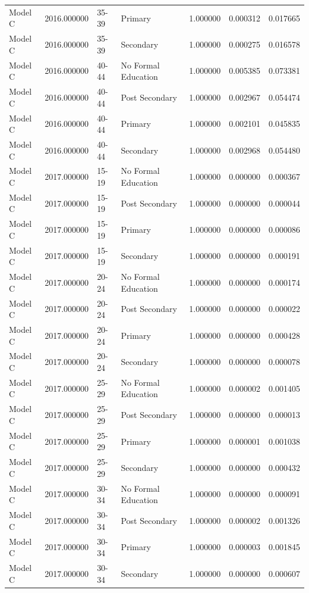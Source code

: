 \begin{table}[ht]
\begin{tabular}{lrllrrr}
Model C & 2016.000000 & 35-39 & Primary & 1.000000 & 0.000312 & 0.017665 \\
Model C & 2016.000000 & 35-39 & Secondary & 1.000000 & 0.000275 & 0.016578 \\
Model C & 2016.000000 & 40-44 & No Formal Education & 1.000000 & 0.005385 & 0.073381 \\
Model C & 2016.000000 & 40-44 & Post Secondary & 1.000000 & 0.002967 & 0.054474 \\
Model C & 2016.000000 & 40-44 & Primary & 1.000000 & 0.002101 & 0.045835 \\
Model C & 2016.000000 & 40-44 & Secondary & 1.000000 & 0.002968 & 0.054480 \\
Model C & 2017.000000 & 15-19 & No Formal Education & 1.000000 & 0.000000 & 0.000367 \\
Model C & 2017.000000 & 15-19 & Post Secondary & 1.000000 & 0.000000 & 0.000044 \\
Model C & 2017.000000 & 15-19 & Primary & 1.000000 & 0.000000 & 0.000086 \\
Model C & 2017.000000 & 15-19 & Secondary & 1.000000 & 0.000000 & 0.000191 \\
Model C & 2017.000000 & 20-24 & No Formal Education & 1.000000 & 0.000000 & 0.000174 \\
Model C & 2017.000000 & 20-24 & Post Secondary & 1.000000 & 0.000000 & 0.000022 \\
Model C & 2017.000000 & 20-24 & Primary & 1.000000 & 0.000000 & 0.000428 \\
Model C & 2017.000000 & 20-24 & Secondary & 1.000000 & 0.000000 & 0.000078 \\
Model C & 2017.000000 & 25-29 & No Formal Education & 1.000000 & 0.000002 & 0.001405 \\
Model C & 2017.000000 & 25-29 & Post Secondary & 1.000000 & 0.000000 & 0.000013 \\
Model C & 2017.000000 & 25-29 & Primary & 1.000000 & 0.000001 & 0.001038 \\
Model C & 2017.000000 & 25-29 & Secondary & 1.000000 & 0.000000 & 0.000432 \\
Model C & 2017.000000 & 30-34 & No Formal Education & 1.000000 & 0.000000 & 0.000091 \\
Model C & 2017.000000 & 30-34 & Post Secondary & 1.000000 & 0.000002 & 0.001326 \\
Model C & 2017.000000 & 30-34 & Primary & 1.000000 & 0.000003 & 0.001845 \\
Model C & 2017.000000 & 30-34 & Secondary & 1.000000 & 0.000000 & 0.000607 \\

\end{tabular}
\end{table}
